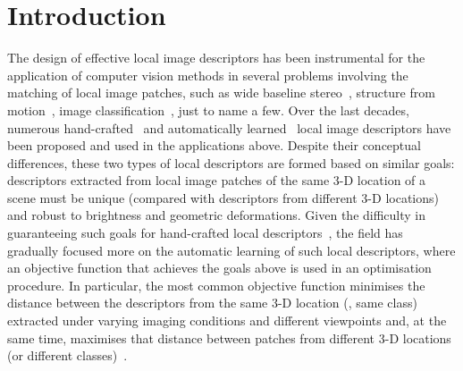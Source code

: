 \documentclass[10pt,twocolumn,letterpaper]{article}
\begin{document}
\section{Introduction}
The design of effective local image descriptors has been instrumental for the application of computer vision methods in several problems involving the matching of local image patches, such as wide baseline stereo~\cite{matas2004robust}, structure from motion~\cite{molton2004locally}, image classification~\cite{lowe1999object,sivic2003video}, just to name a few.  
Over the last decades, numerous hand-crafted~\cite{dalal2005histograms,lowe1999object,schmid1997local} and automatically learned~\cite{brownpami10,carneiro2010automatic,dosovitskiy2014discriminative,Han_cvpr15,masci2014descriptor,Simonyanpami14,trzcinski2013boosting,ZagoruykoCVPR15} local image descriptors have been proposed and used in the applications above.
Despite their conceptual differences, these two types of local descriptors are formed based on similar goals: descriptors extracted from local image patches of the same 3-D location of a scene must be unique (compared with descriptors from different 3-D locations) and robust to brightness and geometric deformations.
Given the difficulty in guaranteeing such goals for hand-crafted local descriptors~\cite{dalal2005histograms,lowe1999object,schmid1997local}, the field has gradually focused more on the automatic learning of such local descriptors, where an objective function that achieves the goals above is used in an optimisation procedure.  In particular, the most common objective function minimises the distance between the descriptors from the same 3-D location (\ie, same class) extracted under varying imaging conditions and different viewpoints and, at the same time, maximises that distance between patches from different 3-D locations (or different classes)~\cite{brownpami10,carneiro2010automatic,dosovitskiy2014discriminative,Han_cvpr15,masci2014descriptor,SimoSerra_2015ICCV,Simonyanpami14,trzcinski2013boosting,ZagoruykoCVPR15}. 
\end{document}
